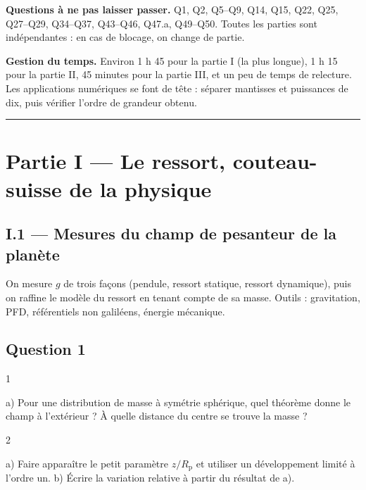 \documentclass[11pt,a4paper]{article}
\begin{document}
\textbf{Questions à ne pas laisser passer.} Q1, Q2, Q5--Q9, Q14, Q15, Q22, Q25, Q27--Q29, Q34--Q37, Q43--Q46, Q47.a, Q49--Q50. Toutes les parties sont indépendantes : en cas de blocage, on change de partie.

\textbf{Gestion du temps.} Environ 1 h 45 pour la partie I (la plus longue), 1 h 15 pour la partie II, 45 minutes pour la partie III, et un peu de temps de relecture. Les applications numériques se font de tête : séparer mantisses et puissances de dix, puis vérifier l'ordre de grandeur obtenu.

\begin{center}\rule{0.5\linewidth}{0.5pt}\end{center}

\hypertarget{partie-i-le-ressort-couteau-suisse-de-la-physique}{%
\section{Partie I --- Le ressort, couteau-suisse de la physique}\label{partie-i-le-ressort-couteau-suisse-de-la-physique}}

\hypertarget{i.1-mesures-du-champ-de-pesanteur-de-la-planuxe8te}{%
\subsection{I.1 --- Mesures du champ de pesanteur de la planète}\label{i.1-mesures-du-champ-de-pesanteur-de-la-planuxe8te}}

On mesure \(g\) de trois façons (pendule, ressort statique, ressort dynamique), puis on raffine le modèle du ressort en tenant compte de sa masse. Outils : gravitation, PFD, référentiels non galiléens, énergie mécanique.

\hypertarget{question-1}{%
\subsection{Question 1}\label{question-1}}

\begin{indication}{1}

a) Pour une distribution de masse à symétrie sphérique, quel théorème donne le champ à l'extérieur ? À quelle distance du centre se trouve la masse ?

\end{indication}

\begin{indication}{2}

a) Faire apparaître le petit paramètre \(z/R_{\mathrm{p}}\) et utiliser un développement limité à l'ordre un. b) Écrire la variation relative à partir du résultat de a).

\end{indication}
\end{document}
